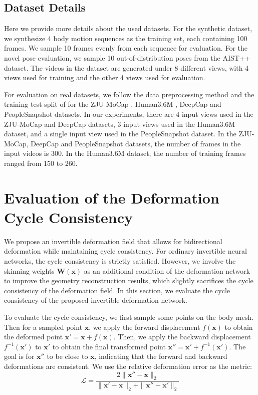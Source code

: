 \subsection{Dataset Details}
Here we provide more details about the used datasets.
For the synthetic dataset, we synthesize 4 body motion sequences as the training set, each containing 100 frames.
We sample 10 frames evenly from each sequence for evaluation.
For the novel pose evaluation, we sample 10 out-of-distribution poses from the AIST++ \cite{aist} dataset.
The videos in the dataset are generated under 8 different views, with 4 views used for training and the other 4 views used for evaluation. 

For evaluation on real datasets, we follow the data preprocessing method and the training-test split of \citet{peng2022animatable} for the ZJU-MoCap \cite{neuralbody}, Human3.6M \cite{h36m}, DeepCap \cite{deepcap} and PeopleSnapshot \cite{alldieck2018video} datasets.
In our experiments, there are 4 input views used in the ZJU-MoCap and DeepCap datasets, 3 input views used in the Human3.6M dataset, and a single input view used in the PeopleSnapshot dataset. 
In the ZJU-MoCap, DeepCap and PeopleSnapshot datasets, the number of frames in the input videos is 300.
In the Human3.6M dataset, the number of training frames ranged from 150 to 260.

\section{Evaluation of the Deformation Cycle Consistency}

We propose an invertible deformation field that allows for bidirectional deformation while maintaining cycle consistency.
For ordinary invertible neural networks, the cycle consistency is strictly satisfied.
However, we involve the skinning weights $\mathbf{W}(\mathbf{x})$ as an additional condition of the deformation network to improve the geometry reconstruction results, which slightly sacrifices the cycle consistency of the deformation field.
In this section, we evaluate the cycle consistency of the proposed invertible deformation network.

To evaluate the cycle consistency, we first sample some points on the body mesh.
Then for a sampled point $\mathbf{x}$, we apply the forward displacement $f(\mathbf{x})$ to obtain the deformed point $\mathbf{x}' = \mathbf{x} + f(\mathbf{x})$.  
Then, we apply the backward displacement $f^{-1}(\mathbf{x}')$ to $\mathbf{x}'$ to obtain the final transformed point $\mathbf{x}'' = \mathbf{x'} + f^{-1}(\mathbf{x}')$.
The goal is for $\mathbf{x}''$ to be close to $\mathbf{x}$, indicating that the forward and backward deformations are consistent.
We use the relative deformation error as the metric:
\begin{equation}
    \mathcal{L} = \frac{2 \|\mathbf{x}'' - \mathbf{x}\|_2} {\|\mathbf{x}' - \mathbf{x}\|_2 + \|\mathbf{x}'' - \mathbf{x}'\|_2}
\end{equation}

